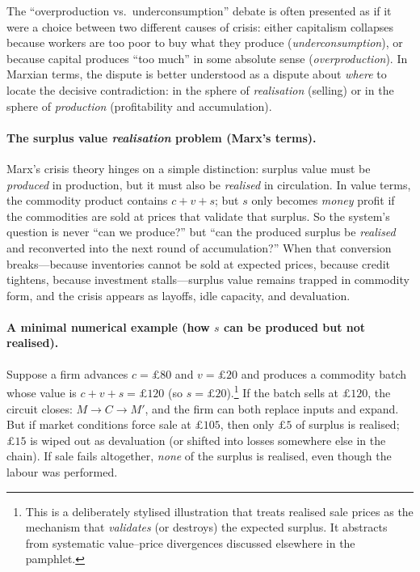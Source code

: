 The “overproduction vs.\ underconsumption” debate is often presented as if it were a choice
between two different causes of crisis:
either capitalism collapses because workers are too poor to buy what they produce
(\emph{underconsumption}), or because capital produces “too much” in some absolute sense
(\emph{overproduction}).
In Marxian terms, the dispute is better understood as a dispute about \emph{where} to locate
the decisive contradiction: in the sphere of \emph{realisation} (selling) or in the sphere of
\emph{production} (profitability and accumulation).

\paragraph{The surplus value \emph{realisation} problem (Marx’s terms).}
Marx’s crisis theory hinges on a simple distinction: surplus value must be
\emph{produced} in production, but it must also be \emph{realised} in circulation.
In value terms, the commodity product contains $c+v+s$; but $s$ only becomes
\emph{money} profit if the commodities are sold at prices that validate that surplus.
So the system’s question is never “can we produce?” but “can the produced surplus be
\emph{realised} and reconverted into the next round of accumulation?”
When that conversion breaks---because inventories cannot be sold at expected prices,
because credit tightens, because investment stalls---surplus value remains trapped in
commodity form, and the crisis appears as layoffs, idle capacity, and devaluation.

\paragraph{A minimal numerical example (how $s$ can be produced but not realised).}
Suppose a firm advances $c=\pounds 80$ and $v=\pounds 20$ and produces a commodity batch whose
value is $c+v+s=\pounds 120$ (so $s=\pounds 20$).\footnote{This is a deliberately stylised illustration that treats realised sale prices as the mechanism that \emph{validates} (or destroys) the expected surplus. It abstracts from systematic value--price divergences discussed elsewhere in the pamphlet.}
If the batch sells at $\pounds 120$, the circuit closes: $M \rightarrow C \rightarrow M'$, and the firm can
both replace inputs and expand.
But if market conditions force sale at $\pounds 105$, then only $\pounds 5$ of surplus is realised;
$\pounds 15$ is wiped out as devaluation (or shifted into losses somewhere else in the chain).
If sale fails altogether, \emph{none} of the surplus is realised, even though the labour was performed.

